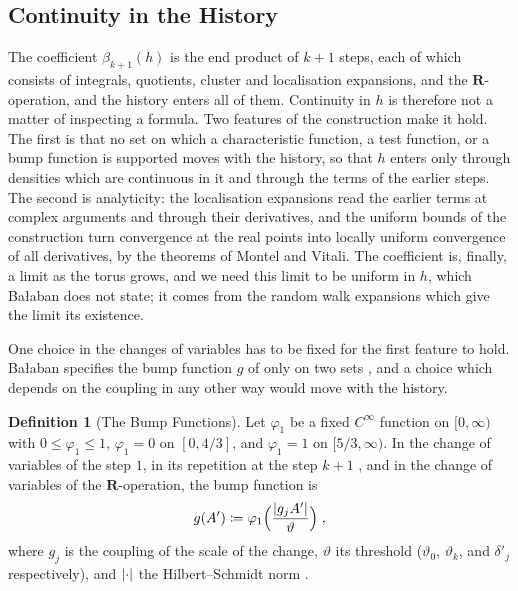 \documentclass[11pt]{preprint}
\DeclarePairedDelimiter{\abs}{\lvert}{\rvert}
\numberwithin{equation}{section}
\theoremstyle{definition}
\newtheorem{definition}[lemma]{Definition}
\theoremstyle{remark}
\theoremstyle{plain}
\begin{document}
\subsection{Continuity in the History}\label{sec:continuity}

The coefficient $\beta_{k+1}(h)$ is the end product of $k + 1$ steps, each of which consists of integrals, quotients, cluster and localisation expansions, and the $\mathbf R$-operation, and the history enters all of them. Continuity in $h$ is therefore not a matter of inspecting a formula. Two features of the construction make it hold. The first is that no set on which a characteristic function, a test function, or a bump function is supported moves with the history, so that $h$ enters only through densities which are continuous in it and through the terms of the earlier steps. The second is analyticity: the localisation expansions read the earlier terms at complex arguments and through their derivatives, and the uniform bounds of the construction turn convergence at the real points into locally uniform convergence of all derivatives, by the theorems of Montel and Vitali. The coefficient is, finally, a limit as the torus grows, and we need this limit to be uniform in $h$, which Ba{\l}aban does not state; it comes from the random walk expansions which give the limit its existence.

One choice in the changes of variables has to be fixed for the first feature to hold. Ba{\l}aban specifies the bump function $g$ of \cite[(1.22), p.~251]{BalabanCRE} only on two sets \cite[p.~252]{BalabanCRE}, and a choice which depends on the coupling in any other way would move with the history.

\begin{definition}[The Bump Functions]\label{def:bump-functions}
Let $\varphi_1$ be a fixed $C^\infty$ function on $[0, \infty)$ with $0 \leq \varphi_1 \leq 1$, $\varphi_1 = 0$ on $[0, 4/3]$, and $\varphi_1 = 1$ on $[5/3, \infty)$. In the change of variables \cite[(1.22), p.~251]{BalabanCRE} of the step $1$, in its repetition at the step $k + 1$ \cite[p.~269]{BalabanCRE}, and in the change of variables \cite[p.~188]{BalabanLFR1} of the $\mathbf R$-operation, the bump function is
\begin{equation}\label{eq:bump-function}
    g(A') \coloneqq \varphi_1\Bigl(\frac{\abs{g_jA'}}{\vartheta}\Bigr)\;,
\end{equation}
where $g_j$ is the coupling of the scale of the change, $\vartheta$ its threshold ($\vartheta_0$, $\vartheta_k$, and $\delta'_j$ respectively), and $\abs{\cdot}$ the Hilbert--Schmidt norm \cite[p.~390]{BalabanPBG}.
\end{definition}
\end{document}
